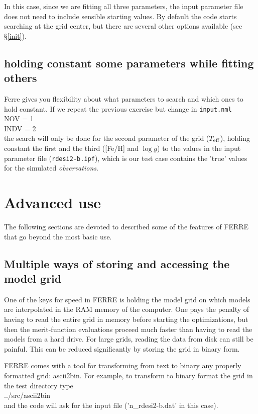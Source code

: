 \documentclass[12pt]{article}
\begin{document}
In this case, since we are fitting all three parameters, the input parameter file 
does not need to include sensible starting values. By default the code 
starts searching at the grid center, but there are several other options available
 (see \S \ref{init}).

\subsection{holding constant some parameters while fitting others}

Ferre gives you flexibility about what parameters to search and which ones 
to hold constant. If we repeat the previous exercise but change in {\tt input.nml} \\
NOV = 1 \\
INDV =  2 \\
the search will only be done for the second parameter of the grid ($T_{\rm eff}$), 
holding constant the first and the third ([Fe/H] and $\log g$) to the values 
in the input parameter file ({\tt rdesi2-b.ipf}), which is our test case 
contains the 'true' values for the simulated {\it observations}.


\section{Advanced use}

The following sections are devoted to described some of the features of FERRE 
that go beyond the most basic use. 

\subsection{Multiple ways of storing and accessing the model grid}

One of the keys for speed in FERRE is holding the model grid on which models
are interpolated in the RAM memory of the computer. One pays the penalty of 
having to read the entire grid in memory before starting the optimizations, 
but then the merit-function evaluations proceed much faster than having to
read the models from a hard drive. For large grids, reading the data from 
disk can still be painful. This can be reduced significantly by storing the
grid in binary form. 

FERRE comes with a tool for transforming from text to
binary any properly formatted grid: ascii2bin. 
For example, to transform to binary format the grid in the test directory type \\
../src/ascii2bin \\
and the code will ask for the input file ('n\_rdesi2-b.dat' in this case). 
\end{document}

